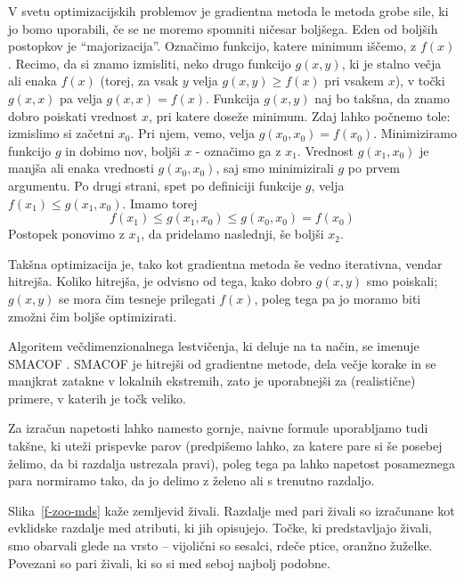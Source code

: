 V svetu optimizacijskih problemov je gradientna metoda le metoda grobe sile, ki jo bomo uporabili, če se ne moremo spomniti ničesar boljšega. Eden od boljših postopkov je ``majorizacija''. Označimo funkcijo, katere minimum iščemo, z $f(x)$. Recimo, da si znamo izmisliti, neko drugo funkcijo $g(x, y)$, ki je stalno večja ali enaka $f(x)$ (torej, za vsak $y$ velja $g(x, y)\ge f(x)$ pri vsakem $x$), v točki $g(x, x)$ pa velja $g(x, x)=f(x)$. Funkcija $g(x, y)$ naj bo takšna, da znamo dobro poiskati vrednost $x$, pri katere doseže minimum. Zdaj lahko počnemo tole: izmislimo si začetni $x_0$. Pri njem, vemo, velja $g(x_0, x_0)=f(x_0)$. Minimiziramo funkcijo $g$ in dobimo nov, boljši $x$ - označimo ga z $x_1$. Vrednost $g(x_1, x_0)$ je manjša ali enaka vrednosti $g(x_0, x_0)$, saj smo minimizirali $g$ po prvem argumentu. Po drugi strani, spet po definiciji funkcije $g$, velja $f(x_1) \le g(x_1, x_0)$. Imamo torej
$$f(x_1) \le g(x_1, x_0) \le g(x_0, x_0) = f(x_0)$$
Postopek ponovimo z $x_1$, da pridelamo naslednji, še boljši $x_2$.

Takšna optimizacija je, tako kot gradientna metoda še vedno iterativna, vendar hitrejša. Koliko hitrejša, je odvisno od tega, kako dobro $g(x, y)$ smo poiskali; $g(x, y)$ se mora čim tesneje prilegati $f(x)$, poleg tega pa jo moramo biti zmožni čim boljše optimizirati.

Algoritem večdimenzionalnega lestvičenja, ki deluje na ta način, se imenuje SMACOF . SMACOF je hitrejši od gradientne metode, dela večje korake in se manjkrat zatakne v lokalnih ekstremih, zato je uporabnejši za (realistične) primere, v katerih je točk veliko.

Za izračun napetosti lahko namesto gornje, naivne formule uporabljamo tudi takšne, ki uteži prispevke parov (predpišemo lahko, za katere pare si še posebej želimo, da bi razdalja ustrezala pravi), poleg tega pa lahko napetost posameznega para normiramo tako, da jo delimo z želeno ali s trenutno razdaljo.

Slika~\ref{f-zoo-mds} kaže zemljevid živali. Razdalje med pari živali so izračunane kot evklidske razdalje med atributi, ki jih opisujejo. Točke, ki predstavljajo živali, smo obarvali glede na vrsto -- vijolični so sesalci, rdeče ptice, oranžno žuželke. Povezani so pari živali, ki so si med seboj najbolj podobne.

